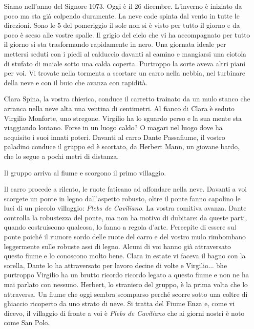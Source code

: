 \documentclass[letterpaper,twocolumn,openany,nodeprecatedcode]{dndbook}
\begin{document}
\begin{DndReadAloud}
Siamo nell'anno del Signore 1073. Oggi è il 26 dicembre. L'inverno è iniziato da poco ma sta già colpendo duramente. La neve cade spinta dal vento in tutte le direzioni. Sono le 5 del pomeriggio il sole non si è visto per tutto il giorno e da poco è sceso alle vostre spalle. Il grigio del cielo che vi ha accompagnato per tutto il giorno si sta trasformando rapidamente in nero. Una giornata ideale per mettersi seduti con i piedi al calduccio davanti al camino e mangiarsi una ciotola di stufato di maiale sotto una calda coperta. Purtroppo la sorte aveva altri piani per voi. Vi trovate nella tormenta a scortare un carro nella nebbia, nel turbinare della neve e con il buio che avanza con rapidità.

Clara Spina, la vostra chierica, conduce il carretto trainato da un mulo stanco che arranca nella neve alta una ventina di centimetri. Al fianco di Clara è seduto Virgilio Monforte, uno stregone. Virgilio ha lo sguardo perso e la sua mente sta viaggiando lontano. Forse in un luogo caldo? O magari nel luogo dove ha acquisito i suoi innati poteri. Davanti al carro Dante Passafiume, il vostro paladino conduce il gruppo ed è scortato, da Herbert Mann, un giovane bardo, che lo segue a pochi metri di distanza. 
\end{DndReadAloud}

Il gruppo arriva al fiume e scorgono il primo villaggio.

\begin{DndReadAloud}
Il carro procede a rilento, le ruote faticano ad affondare nella neve. Davanti a voi scorgete un ponte in legno dall'aspetto robusto, oltre il ponte fanno capolino le luci di un piccolo villaggio: \textit{Plebs de Caviliano}. La vostra comitiva avanza. Dante controlla la robustezza del ponte, ma non ha motivo di dubitare: da queste parti, quando costruiscono qualcosa, lo fanno a regola d'arte. Percepite di essere sul ponte poiché il rumore sordo delle ruote del carro e del vostro mulo rimbombano leggermente sulle robuste assi di legno. Alcuni di voi hanno già attraversato questo fiume e lo conoscono molto bene. Clara in estate vi faceva il bagno con la sorella, Dante lo ha attraversato per lavoro decine di volte e Virgilio... bhe purtroppo Virgilio ha un brutto ricordo ricordo legato a questo fiume e non ne ha mai parlato con nessuno. Herbert, lo straniero del gruppo, è la prima volta che lo attraversa. Un fiume che oggi sembra scomparso perché scorre sotto una coltre di ghiaccio ricoperto da uno strato di neve. Si tratta del Fiume Enza e, come vi dicevo, il villaggio di fronte a voi è  \textit{Plebs de Caviliano} che ai giorni nostri è noto come San Polo.
\end{DndReadAloud}
\end{document}
